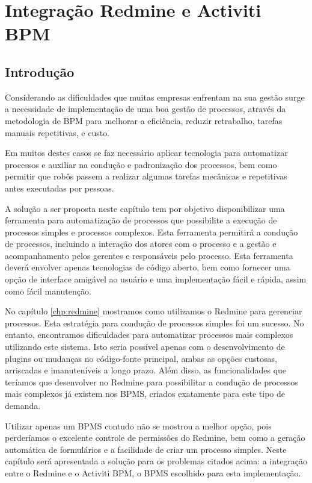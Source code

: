 \chapter{Integração Redmine e Activiti BPM}\label{chp:integracao_redmine_activiti}

\section{Introdução}\label{sec:integracao_intro}

Considerando as dificuldades que muitas empresas enfrentam na sua gestão surge a necessidade de implementação de uma boa gestão de processos, através da metodologia de BPM para melhorar a eficiência, reduzir retrabalho, tarefas manuais repetitivas, e custo.

Em muitos destes casos se faz necessário aplicar tecnologia para automatizar processos e auxiliar na condução e padronização dos processos, bem como permitir que robôs passem a realizar algumas tarefas mecânicas e repetitivas antes executadas por pessoas.

A solução a ser proposta neste capítulo tem por objetivo disponibilizar uma ferramenta para automatização de processos que possibilite a execução de processos simples e processos complexos. Esta ferramenta permitirá a condução de processos, incluindo a interação dos atores com o processo e a gestão e acompanhamento pelos gerentes e responsáveis pelo processo. Esta ferramenta deverá envolver apenas tecnologias de código aberto, bem como fornecer uma opção de interface amigável ao usuário e uma implementação fácil e rápida, assim como fácil manutenção.

No capítulo \ref{chp:redmine} mostramos como utilizamos o Redmine para gerenciar processos. Esta estratégia para condução de processos simples foi um sucesso. No entanto, encontramos dificuldades para automatizar processos mais complexos utilizando este sistema. Isto seria possível apenas com o desenvolvimento de plugins ou mudanças no código-fonte principal, ambas as opções custosas, arriscadas e imanuteníveis a longo prazo. Além disso, as funcionalidades que teríamos que desenvolver no Redmine para possibilitar a condução de processos mais complexos já existem nos BPMS, criados exatamente para este tipo de demanda. 

Utilizar apenas um BPMS contudo não se mostrou a melhor opção, pois perderíamos o excelente controle de permissões do Redmine, bem como a geração automática de formulários e a facilidade de criar um processo simples. 
Neste capítulo será apresentada a solução para os problemas citados acima: a integração entre o Redmine e o Activiti BPM, o BPMS escolhido para esta implementação.

